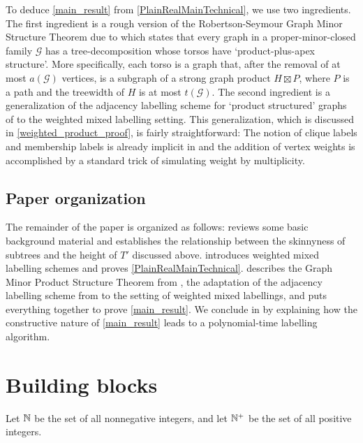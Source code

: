 \documentclass{patmorin}
\newcommand{\defin}[1]{\emph{\textcolor{brightmaroon}{#1}}}
\newcommand{\calG}{\mathcal{G}}
\begin{document}
  To deduce \cref{main_result} from \cref{PlainRealMainTechnical}, we use two ingredients.  The first ingredient is a rough
  version of the Robertson-Seymour Graph Minor Structure Theorem due to \citet{dujmovic.joret.ea:planar} which states that every graph in a proper-minor-closed family $\calG$ has a tree-decomposition whose torsos have `product-plus-apex structure'. More specifically, each torso is a graph that, after the removal of at most $a(\calG)$ vertices, is a subgraph of a strong graph product $H\boxtimes P$, where $P$ is a path and the treewidth of $H$ is at most $t(\calG)$.  The second ingredient is a generalization of the adjacency labelling scheme for `product structured' graphs of \citet{dujmovic.esperet.ea:adjacency} to the weighted mixed labelling setting.  This generalization, which is discussed in \cref{weighted_product_proof}, is fairly straightforward: The notion of clique labels and membership labels is already implicit in \cite{dujmovic.esperet.ea:adjacency} and the addition of vertex weights is accomplished by a standard trick of simulating weight by multiplicity.

\subsection{Paper organization}

  The remainder of the paper is organized as follows:   reviews some basic background material and establishes the relationship between the skinnyness of subtrees and the height of $T'$ discussed above.   introduces weighted mixed labelling schemes and proves \cref{PlainRealMainTechnical}.   describes the Graph Minor Product Structure Theorem from \cite{dujmovic.joret.ea:planar}, the adaptation of the adjacency labelling scheme from \cite{dujmovic.esperet.ea:adjacency} to the setting of weighted mixed labellings, and puts everything together to prove \cref{main_result}. We conclude in  by explaining how the constructive nature of \cref{main_result} leads to a
polynomial-time labelling algorithm.

  \section{Building blocks}\label{building_blocks}

Let \defin{$\mathbb{N}$} be the set of all nonnegative integers, and let \defin{$\mathbb{N}^+$} be the set of all positive integers.
\end{document}
